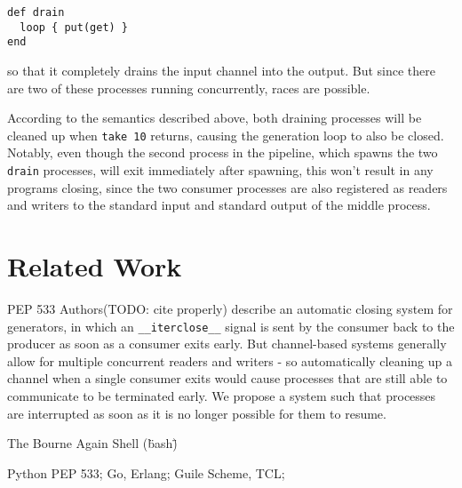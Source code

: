 \documentclass[sigplan,10pt,nosumlimits]{acmart}
\begin{document}
\begin{verbatim}
def drain
  loop { put(get) }
end
\end{verbatim}
so that it completely drains the input channel into the output.
But since there are two of these processes running concurrently, races are possible.

According to the semantics described above, both draining processes will be cleaned up when \verb/take 10/ returns, causing the generation loop to also be closed.
Notably, even though the second process in the pipeline, which spawns the two \verb/drain/ processes, will exit immediately after spawning, this won't result in any programs closing, since the two consumer processes are also registered as readers and writers to the standard input and standard output of the middle process.




\section{Related Work}

PEP 533 Authors(TODO: cite properly) describe an automatic closing system for generators, in which an \verb/__iterclose__/ signal is sent by the consumer back to the producer as soon as a consumer exits early.
But channel-based systems generally allow for multiple concurrent readers and writers - so automatically cleaning up a channel when a single consumer exits would cause processes that are still able to communicate to be terminated early.
We propose a system such that processes are interrupted as soon as it is no longer possible for them to resume.

The Bourne Again Shell (\"bash\")

Python PEP 533; Go, Erlang; Guile Scheme, TCL;
\end{document}
